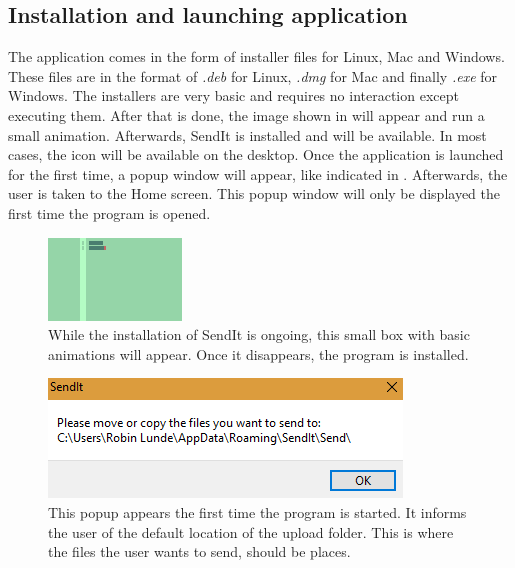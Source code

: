 	\subsection{Installation and launching application}
	The application comes in the form of installer files for Linux, Mac and Windows. These files are in the format of \emph{.deb} for Linux, \emph{.dmg} for Mac and finally \emph{.exe} for Windows. The installers are very basic and requires no interaction except executing them. After that is done, the image shown in  will appear and run a small animation. Afterwards, SendIt is installed and will be available. In most cases, the icon will be available on the desktop. Once the application is launched for the first time, a popup window will appear, like indicated in . Afterwards, the user is taken to the Home screen. This popup window will only be displayed the first time the program is opened.
	\begin{figure}[H]
		\centering
		\includegraphics[width=\textwidth]{Figures/Base/installer}
		\decoRule
		\caption[Install animation]{While the installation of SendIt is ongoing, this small box with basic animations will appear. Once it disappears, the program is installed.}
		\label{fig:inst}
	\end{figure}

	\begin{figure}[H]
		\centering
		\includegraphics[width=\textwidth]{Figures/Base/start_up}
		\decoRule
		\caption[First time popup]{This popup appears the first time the program is started. It informs the user of the default location of the upload folder. This is where the files the user wants to send, should be places.}
		\label{fig:popup}
	\end{figure}	
